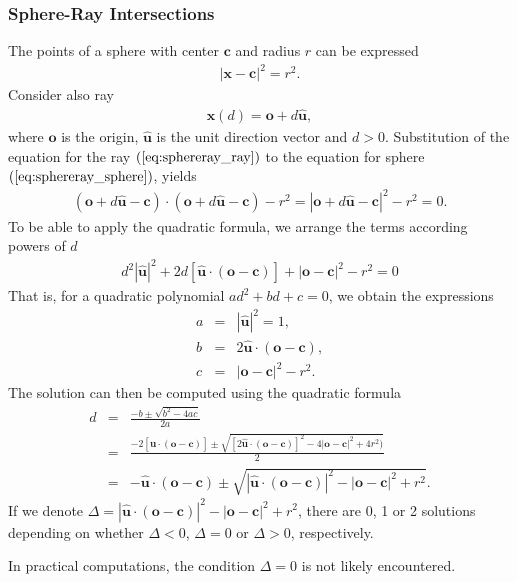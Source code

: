 \documentclass [12pt, a4paper] {article}
\newcommand{\vu}[1]
{
	\mathbf{\hat #1}
}
\newcommand{\vc}[1]
{
	\boldsymbol{#1}
}
\begin{document}
\subsubsection{Sphere-Ray Intersections}
The points of a sphere with center $\vc c$ and radius $r$ can be expressed 
\begin {eqnarray}
    \label{eq:sphereray_sphere}
    | \vc x - \vc c |^2 = r^2.
\end {eqnarray}
Consider also ray 
\begin {eqnarray}
    \label{eq:sphereray_ray}
    \vc x(d) = \vc o + d\vu u,
\end {eqnarray}
where $\vc o$ is the origin, $\vu u$ is the unit direction vector and $d>0$.
Substitution of the equation for the ray $(\ref{eq:sphereray_ray})$ to 
the equation for sphere $(\ref{eq:sphereray_sphere})$, yields
\begin {eqnarray}
    (\vc o + d\vu u - \vc c) \cdot (\vc o + d\vu u - \vc c) - r^2
    =
    |\vc o + d\vu u - \vc c|^2 - r^2 = 0.
\end {eqnarray}
To be able to apply the quadratic formula, we arrange the terms according powers 
of $d$
\begin {eqnarray}
    d^2|\vu u|^2 + 2d\left[
        \vu u\cdot (\vc o - \vc c)
    \right]
    + |\vc o - \vc c|^2 - r^2 = 0
\end {eqnarray}
That is, for a quadratic polynomial $ad^2 + bd + c = 0$, we obtain the expressions  
\begin {eqnarray}
    a &=& |\vu u|^2 = 1, \\
    b &=& 2\vu u\cdot(\vc o - \vc c), \\
    c &=& |\vc o - \vc c|^2 - r^2.
\end {eqnarray}
The solution can then be computed using the quadratic formula  
\begin {eqnarray}
    d 
    &=& 
    \frac{-b \pm \sqrt{b^2 - 4ac}}{2a}
    \\
    &=& 
    \frac{-2\left[\vu u\cdot(\vc o - \vc c)\right] 
    \pm 
    \sqrt{[2\vu u\cdot(\vc o - \vc c)]^2 - 4|\vc o - \vc c|^2 + 4r^2)}}{2}
    \\
    &=& 
    -\vu u\cdot(\vc o - \vc c)
    \pm
    \sqrt{|\vu u\cdot(\vc o - \vc c)|^2 - |\vc o - \vc c|^2 + r^2}.
\end {eqnarray}
If we denote
$\Delta = |\vu u\cdot(\vc o - \vc c)|^2 - |\vc o - \vc c|^2 + r^2$,
there are 0, 1 or 2 solutions depending on whether $\Delta<0$, $\Delta=0$ or 
$\Delta>0$, respectively. 

In practical computations, the condition $\Delta=0$ is not likely encountered.
\end{document}
